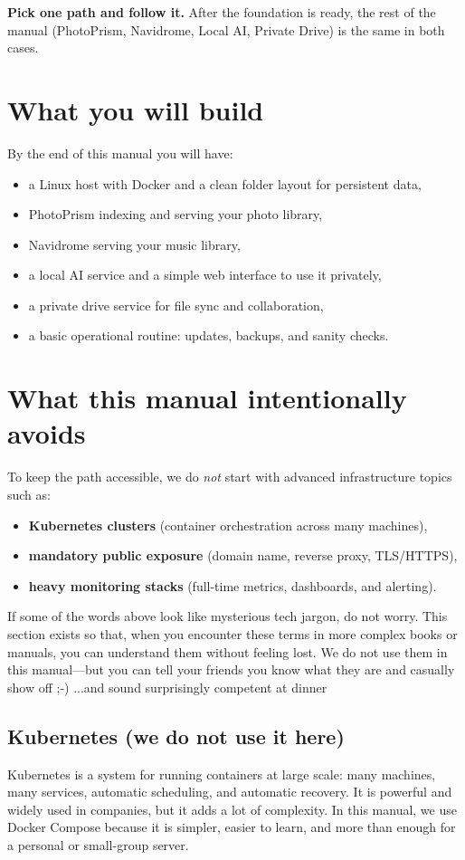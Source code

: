 \textbf{Pick one path and follow it.} After the foundation is ready, the rest of the manual (PhotoPrism, Navidrome, Local AI, Private Drive) is the same in both cases.


\section{What you will build}
By the end of this manual you will have:
\begin{itemize}[leftmargin=*]
  \item a Linux host with Docker and a clean folder layout for persistent data,
  \item PhotoPrism indexing and serving your photo library,
  \item Navidrome serving your music library,
  \item a local AI service and a simple web interface to use it privately,
  \item a private drive service for file sync and collaboration,
  \item a basic operational routine: updates, backups, and sanity checks.
\end{itemize}

\section{What this manual intentionally avoids}
To keep the path accessible, we do \emph{not} start with advanced infrastructure topics such as:
\begin{itemize}[leftmargin=*]
  \item \textbf{Kubernetes clusters} (container orchestration across many machines),
  \item \textbf{mandatory public exposure} (domain name, reverse proxy, TLS/HTTPS),
  \item \textbf{heavy monitoring stacks} (full-time metrics, dashboards, and alerting).
\end{itemize}

If some of the words above look like mysterious tech jargon, do not worry.
This section exists so that, when you encounter these terms in more complex books or manuals, you can understand them without feeling lost.
We do not use them in this manual---but you can tell your friends you know what they are and casually show off ;-) ...and sound surprisingly competent at dinner

\subsection*{Kubernetes (we do not use it here)}
Kubernetes is a system for running containers at large scale: many machines, many services, automatic scheduling, and automatic recovery.
It is powerful and widely used in companies, but it adds a lot of complexity.
In this manual, we use Docker Compose because it is simpler, easier to learn, and more than enough for a personal or small-group server.

